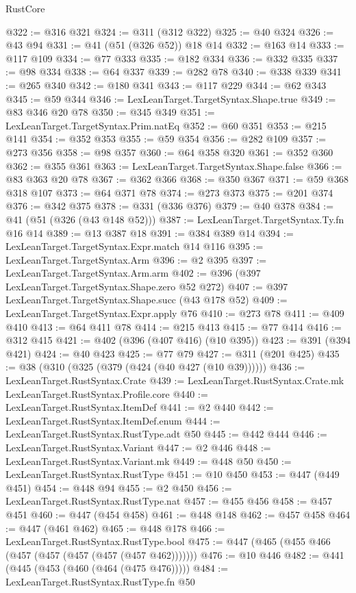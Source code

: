 \begin{lexlean}{RustCore}
\begin{coremodule}
@322 := @316 @321
@324 := @311 (@312 @322)
@325 := @40 @324
@326 := @43 @94
@331 := @41 (@51 (@326 @52)) @18 @14
@332 := @163 @14
@333 := @117 @109
@334 := @77 @333
@335 := @182 @334
@336 := @332 @335
@337 := @98 @334
@338 := @64 @337
@339 := @282 @78
@340 := @338 @339
@341 := @265 @340
@342 := @180 @341
@343 := @117 @229
@344 := @62 @343
@345 := @59 @344
@346 := LexLeanTarget.TargetSyntax.Shape.true
@349 := @83 @346 @20 @78
@350 := @345 @349
@351 := LexLeanTarget.TargetSyntax.Prim.natEq
@352 := @60 @351
@353 := @215 @141
@354 := @352 @353
@355 := @59 @354
@356 := @282 @109
@357 := @273 @356
@358 := @98 @357
@360 := @64 @358 @320
@361 := @352 @360
@362 := @355 @361
@363 := LexLeanTarget.TargetSyntax.Shape.false
@366 := @83 @363 @20 @78
@367 := @362 @366
@368 := @350 @367
@371 := @59 @368 @318 @107
@373 := @64 @371 @78
@374 := @273 @373
@375 := @201 @374
@376 := @342 @375
@378 := @331 (@336 @376)
@379 := @40 @378
@384 := @41 (@51 (@326 (@43 @148 @52)))
@387 := LexLeanTarget.TargetSyntax.Ty.fn @16 @14
@389 := @13 @387 @18
@391 := @384 @389 @14
@394 := LexLeanTarget.TargetSyntax.Expr.match @14 @116
@395 := LexLeanTarget.TargetSyntax.Arm
@396 := @2 @395
@397 := LexLeanTarget.TargetSyntax.Arm.arm
@402 := @396 (@397 LexLeanTarget.TargetSyntax.Shape.zero @52 @272)
@407 := @397 LexLeanTarget.TargetSyntax.Shape.succ (@43 @178 @52)
@409 := LexLeanTarget.TargetSyntax.Expr.apply @76
@410 := @273 @78
@411 := @409 @410
@413 := @64 @411 @78
@414 := @215 @413
@415 := @77 @414
@416 := @312 @415
@421 := @402 (@396 (@407 @416) (@10 @395))
@423 := @391 (@394 @421)
@424 := @40 @423
@425 := @77 @79
@427 := @311 (@201 @425)
@435 := @38 (@310 (@325 (@379 (@424 (@40 @427 (@10 @39))))))
@436 := LexLeanTarget.RustSyntax.Crate
@439 := LexLeanTarget.RustSyntax.Crate.mk LexLeanTarget.RustSyntax.Profile.core
@440 := LexLeanTarget.RustSyntax.ItemDef
@441 := @2 @440
@442 := LexLeanTarget.RustSyntax.ItemDef.enum
@444 := LexLeanTarget.RustSyntax.RustType.adt @50
@445 := @442 @444
@446 := LexLeanTarget.RustSyntax.Variant
@447 := @2 @446
@448 := LexLeanTarget.RustSyntax.Variant.mk
@449 := @448 @50
@450 := LexLeanTarget.RustSyntax.RustType
@451 := @10 @450
@453 := @447 (@449 @451)
@454 := @448 @94
@455 := @2 @450
@456 := LexLeanTarget.RustSyntax.RustType.nat
@457 := @455 @456
@458 := @457 @451
@460 := @447 (@454 @458)
@461 := @448 @148
@462 := @457 @458
@464 := @447 (@461 @462)
@465 := @448 @178
@466 := LexLeanTarget.RustSyntax.RustType.bool
@475 := @447 (@465 (@455 @466 (@457 (@457 (@457 (@457 (@457 @462)))))))
@476 := @10 @446
@482 := @441 (@445 (@453 (@460 (@464 (@475 @476)))))
@484 := LexLeanTarget.RustSyntax.RustType.fn @50

\end{coremodule}
\end{lexlean}
